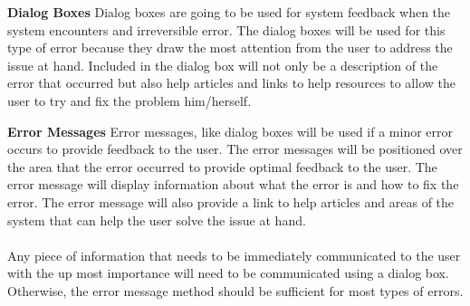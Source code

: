 \documentclass[letterpaper,12pt]{report}
\begin{document}
\begin{description}
 \item \textbf{Dialog Boxes} \newline Dialog boxes are going to be used for system feedback when the system encounters and irreversible error. The dialog boxes will be used for this type of error because they draw the most attention from the user to address the issue at hand. Included in the dialog box will not only be a description of the error that occurred but also help articles and links to help resources to allow the user to try and fix the problem him/herself. 
 \item \textbf{Error Messages} \newline Error messages, like dialog boxes will be used if a minor error occurs to provide feedback to the user. The error messages will be positioned over the area that the error occurred to provide optimal feedback to the user. The error message will display information about what the error is and how to fix the error. The error message will also provide a link to help articles and areas of the system that can help the user solve the issue at hand. 
 \end{description}

\paragraph*{}\hspace{0.6cm}Any piece of information that needs to be immediately communicated to the user with the up most importance will need to be communicated using a dialog box. Otherwise, the error message method should be sufficient for most types of errors. 
\newpage
\end{document}
